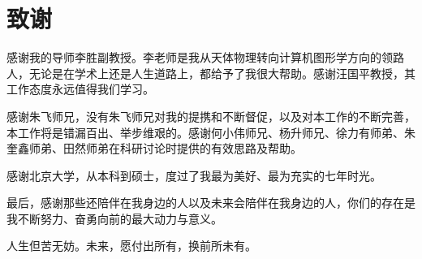 \chapter{致谢}
感谢我的导师李胜副教授。李老师是我从天体物理转向计算机图形学方向的领路人，无论是在学术上还是人生道路上，都给予了我很大帮助。感谢汪国平教授，其工作态度永远值得我们学习。

感谢朱飞师兄，没有朱飞师兄对我的提携和不断督促，以及对本工作的不断完善，本工作将是错漏百出、举步维艰的。感谢何小伟师兄、杨升师兄、徐力有师弟、朱奎鑫师弟、田然师弟在科研讨论时提供的有效思路及帮助。

感谢北京大学，从本科到硕士，度过了我最为美好、最为充实的七年时光。

最后，感谢那些还陪伴在我身边的人以及未来会陪伴在我身边的人，你们的存在是我不断努力、奋勇向前的最大动力与意义。

人生但苦无妨。未来，愿付出所有，换前所未有。
